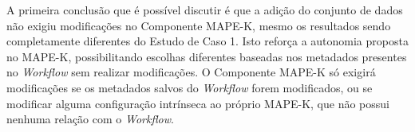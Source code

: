 \documentclass[portugues]{ic-tese}
\begin{document}
\begin{table}[H]
\begin{center}
  \caption{Quantidade de modificações realizadas ao adicionar um novo conjunto de dados ao \textit{Workflow}}
\label{tbl:ManutencaoPipelineDataset}
\end{center}
\end{table}

A primeira conclusão que é possível discutir é que a adição do conjunto de dados não exigiu modificações no Componente MAPE-K, mesmo os resultados sendo completamente diferentes do Estudo de Caso 1. Isto reforça a autonomia proposta no MAPE-K, possibilitando escolhas diferentes baseadas nos metadados presentes no \textit{Workflow} sem realizar modificações. O Componente MAPE-K só exigirá modificações se os metadados salvos do \textit{Workflow} forem modificados, ou se modificar alguma configuração intrínseca ao próprio MAPE-K, que não possui nenhuma relação com o \textit{Workflow}. 
\end{document}
